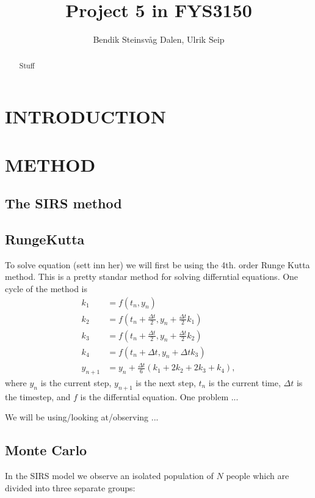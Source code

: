 \documentclass[a4paper]{article}
\title{Project 5 in FYS3150}
\author{Bendik Steinsvåg Dalen, Ulrik Seip}
\let\Oldsection\section
\renewcommand{\section}{\FloatBarrier\Oldsection}
\let\Oldsubsection\subsection
\renewcommand{\subsection}{\FloatBarrier\Oldsubsection}
\begin{document}
\maketitle


\begin{abstract}
	Stuff
\end{abstract}


\section{INTRODUCTION}


\section{METHOD}

\subsection{The SIRS method}


\subsection{RungeKutta}
To solve equation (sett inn her) we will first be using the 4th. order Runge Kutta method. This is a pretty standar method for solving differntial equations. One cycle of the method is
\begin{align}
k_1 &= f(t_n,y_n) \\
k_2 &= f(t_n + \frac{\Delta t}{2},y_n + \frac{\Delta t}{2} k_1) \\
k_3 &= f(t_n + \frac{\Delta t}{2},y_n + \frac{\Delta t}{2} k_2) \\
k_4 &= f(t_n + \Delta t, y_n + \Delta t k_3) \\
y_{n+1} &= y_n + \frac{\Delta t}{6} \left( k_1 + 2k_2 + 2k_3 + k_4 \right),
\end{align}
where $y_n$ is the current step, $y_{n+1}$ is the next step, $t_n$ is the current time, $\Delta t$ is the timestep, and $f$ is the differntial equation. 
One problem ...

We will be using/looking at/observing ...

\subsection{Monte Carlo}

In the SIRS model we observe an isolated population of $N$ people which are divided into three separate groups:
\end{document}

